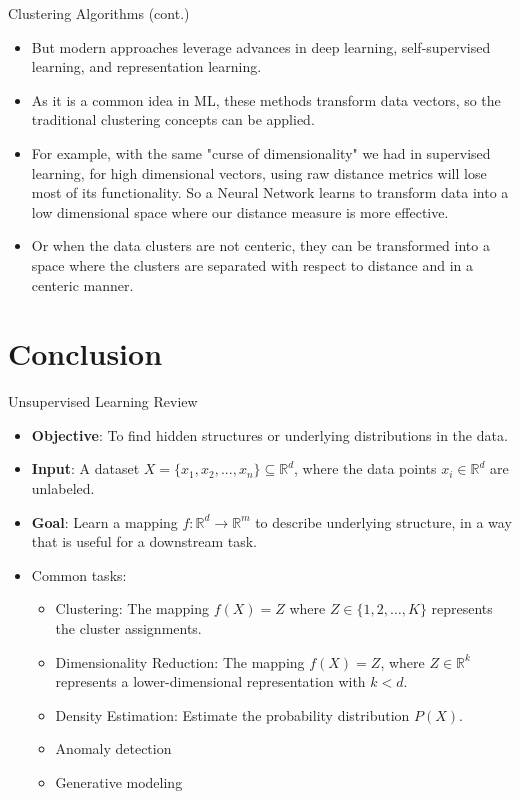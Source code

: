 \documentclass[serif, aspectratio=169]{beamer}
\begin{document}
\begin{frame}{Clustering Algorithms (cont.)}
\begin{itemize}
    \item But modern approaches leverage advances in deep learning, self-supervised learning, and representation learning.
    \item As it is a common idea in ML, these methods transform data vectors, so the traditional clustering concepts can be applied.
    \item For example, with the same "curse of dimensionality" we had in supervised learning, for high dimensional vectors, using raw distance metrics will lose most of its functionality. So a Neural Network learns to transform data into a low dimensional space where our distance measure is more effective.
    \item Or when the data clusters are not centeric, they can be transformed into a space where the clusters are separated with respect to distance and in a centeric manner.

\end{itemize}
\end{frame}

\section{Conclusion}

\begin{frame}{Unsupervised Learning Review}
    \begin{itemize}
        \item \textbf{Objective}: To find hidden structures or underlying distributions in the data.
        \item \textbf{Input}: A dataset \( X = \{x_1, x_2, ..., x_n\} \subseteq \mathbb{R}^d \), where the data points \( x_i \in \mathbb{R}^d \) are unlabeled.
        \item \textbf{Goal}: Learn a mapping \( f: \mathbb{R}^d \to \mathbb{R}^m \) to describe underlying structure, in a way that is useful for a downstream task.
        \item Common tasks: 
        \begin{itemize}
            \item Clustering: The mapping \( f(X) = Z \) where \( Z \in \{1, 2, \dots, K\} \) represents the cluster assignments.
        
        \item Dimensionality Reduction: The mapping \( f(X) = Z \), where \( Z \in \mathbb{R}^k \) represents a lower-dimensional representation with \( k < d \).
        
        \item Density Estimation: Estimate the probability distribution \( P(X) \).
        \item Anomaly detection
        \item Generative modeling
        \end{itemize}
    \end{itemize}
\end{frame}
\end{document}
